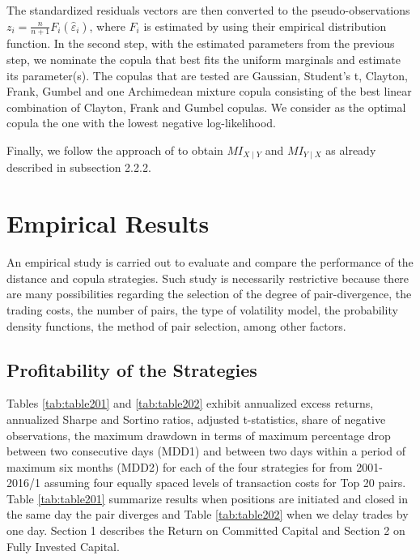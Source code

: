 \documentclass[a4paper,12pt]{report}
\begin{document}
The standardized residuals vectors are then converted to the pseudo-observations $z_{i}=\frac{n}{n+1}F_{i}\left( \widehat{\varepsilon }_{i}\right) $, where $F_{i}$ is estimated by using their empirical distribution function. In the second step, with the estimated parameters from the previous step, we nominate the copula that best fits the uniform marginals and estimate its parameter(s). The copulas that are tested are Gaussian, Student's t, Clayton, Frank, Gumbel and one Archimedean mixture copula consisting of the best linear combination of Clayton, Frank and Gumbel copulas. We consider as the optimal copula the one with the lowest negative log-likelihood.

Finally, we follow the approach of \citet*{xie14} to obtain $MI_{X\mid Y}$ and $MI_{Y\mid X}$ as already described in subsection 2.2.2.

\vspace{0.6cm}

\section{Empirical Results}

An empirical study is carried out to evaluate and compare the performance of the distance and copula strategies. Such study is necessarily restrictive because there are many possibilities regarding the selection of the degree of pair-divergence, the trading costs, the number of pairs, the type of volatility model, the probability density functions, the method of pair selection, among other factors.

\vspace{0.3cm}

\subsection{Profitability of the Strategies}

Tables \ref{tab:table201} and \ref{tab:table202} exhibit annualized excess returns, annualized Sharpe and Sortino ratios, \citet*{nw87} adjusted t-statistics, share of negative observations, the maximum drawdown in terms of maximum percentage drop between two consecutive days (MDD1) and between two days within a period of maximum six months (MDD2) for each of the four strategies for from 2001-2016/1 assuming four equally spaced levels of transaction costs for Top 20 pairs. Table \ref{tab:table201} summarize results when positions are initiated and closed in the same day the pair diverges and Table \ref{tab:table202} when we delay trades by one day. Section 1 describes the Return on Committed Capital and Section 2 on Fully Invested Capital.
\end{document}
